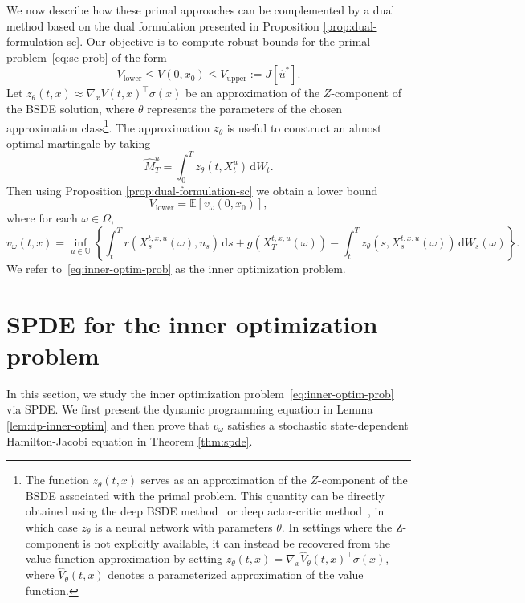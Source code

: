 \documentclass[11pt]{article}
\numberwithin{equation}{section}
\theoremstyle{plain}
\theoremstyle{definition}
\theoremstyle{remark}
\newcommand{\bE}{\mathbb{E}}
\newcommand{\dd}{\mathrm{d}}
\begin{document}
We now describe how these primal approaches can be complemented by a dual method based on the dual formulation presented in Proposition \ref{prop:dual-formulation-sc}.  Our objective is to compute robust bounds for the primal problem~\eqref{eq:sc-prob} of the form  
\begin{equation*}
    V_{\text{lower}} \le V(0, x_0) \le V_{\text{upper}}:= J[\hat{u}^*].
\end{equation*}
Let $z_\theta(t,x) \approx \nabla_x V(t,x)^\top \sigma(x)$ be an approximation of the $Z$-component of the BSDE solution, where $\theta$ represents the parameters of the chosen approximation class\footnote{The function $z_\theta(t,x)$ serves as an approximation of the $Z$-component of the BSDE associated with the primal problem. This quantity can be directly obtained using the deep BSDE method~\cite{E2017deepbsde} or deep actor-critic method~\cite{zhou2024solving}, in which case $z_\theta$ is a neural network with parameters $\theta$. In settings where the Z-component is not explicitly available, it can instead be recovered from the value function approximation by setting $z_\theta(t, x) = \nabla_x \hat{V}_\theta(t,x)^\top \sigma(x)$,  where $\hat{V}_\theta(t,x)$ denotes a parameterized approximation of the value function.}. The approximation $z_\theta$ is useful to construct an almost optimal martingale by taking 
\begin{equation*}
    \hat{M}_T^u = \int_0^T z_\theta(t, X_t^u)\,\dd W_t. 
\end{equation*}
Then using Proposition \ref{prop:dual-formulation-sc} we obtain a lower bound 
\begin{equation} \label{eq:lower-bound}
    V_{\text{lower}} = \bE\left[ v_\omega(0,x_0) \right], 
\end{equation}
where for each $\omega \in \Omega$, 
\begin{equation} \label{eq:inner-optim-prob}
    v_\omega(t,x) = \inf_{u \in \mathbb{U}} \left\{ \int_t^T r(X_s^{t, x, u}(\omega), u_s)\,\dd s + g(X_T^{t,x,u}(\omega)) - \int_t^T z_\theta(s, X_s^{t,x,u}(\omega))\,\dd W_s(\omega) \right\}. 
\end{equation}
We refer to~\eqref{eq:inner-optim-prob} as the inner optimization problem. 

\section{SPDE for the inner optimization problem} \label{sec:spde-inner-prob}
In this section, we study the inner optimization problem~\eqref{eq:inner-optim-prob} via SPDE. We first present the dynamic programming equation in Lemma \ref{lem:dp-inner-optim} and then prove that $v_\omega$ satisfies a stochastic state-dependent Hamilton-Jacobi equation in Theorem \ref{thm:spde}. 
\end{document}
